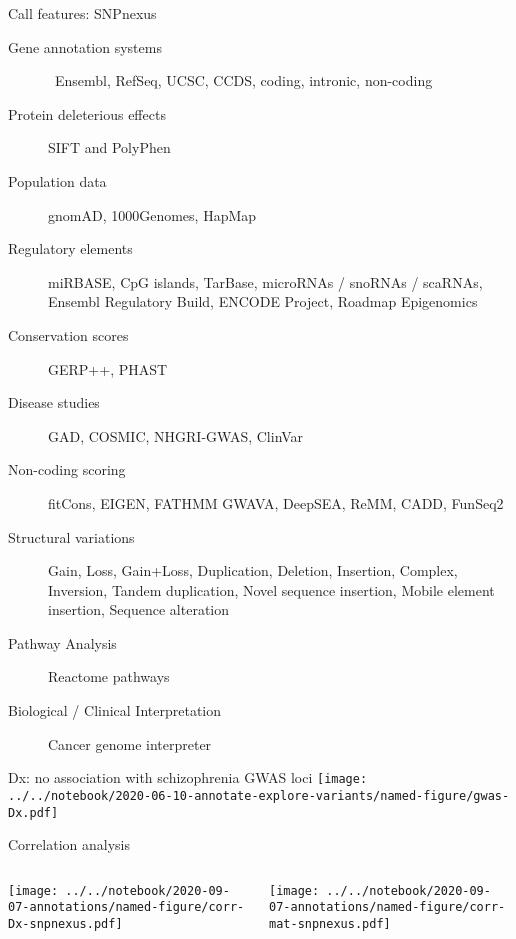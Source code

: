 \documentclass[usenames,dvipsnames]{beamer}
\begin{document}
\begin{frame}{Call features: SNPnexus}
	\tiny
	\begin{description}
		\item[Gene annotation systems]  Ensembl, RefSeq, UCSC, CCDS, coding, intronic, non-coding
                \item[Protein deleterious effects] SIFT and PolyPhen
                \item[Population data] gnomAD, 1000Genomes, HapMap
                \item[Regulatory elements] miRBASE, CpG islands, TarBase, microRNAs / snoRNAs / scaRNAs, Ensembl Regulatory Build, ENCODE Project, Roadmap Epigenomics 
                \item[Conservation scores] GERP++, PHAST 
                \item[Disease studies] GAD, COSMIC, NHGRI-GWAS, ClinVar
                \item[Non-coding scoring] fitCons, EIGEN, FATHMM GWAVA, DeepSEA, ReMM, CADD, FunSeq2 
                \item[Structural variations] Gain, Loss, Gain+Loss, Duplication, Deletion, Insertion, Complex, Inversion, Tandem duplication, Novel sequence insertion, Mobile element insertion, Sequence alteration 
                \item[Pathway Analysis] Reactome pathways 
                \item[Biological / Clinical Interpretation] Cancer genome interpreter 
	\end{description}
\end{frame}

\begin{frame}{Dx: no association with schizophrenia GWAS loci}
\texttt{[image: ../../notebook/2020-06-10-annotate-explore-variants/named-figure/gwas-Dx.pdf]}
\end{frame}


\begin{frame}{Correlation analysis}
\begin{columns}[t]
\begin{column}{0.4\textwidth}

\texttt{[image: ../../notebook/2020-09-07-annotations/named-figure/corr-Dx-snpnexus.pdf]}
\end{column}

\begin{column}{0.5\textwidth}

\texttt{[image: ../../notebook/2020-09-07-annotations/named-figure/corr-mat-snpnexus.pdf]}
\end{column}
\end{columns}
\end{frame}
\end{document}

